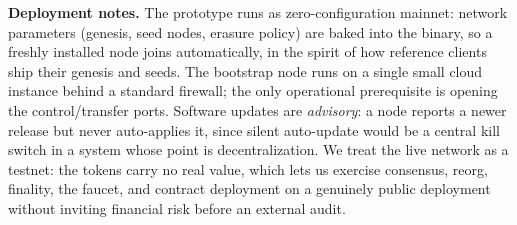 \textbf{Deployment notes.} The prototype runs as zero-configuration mainnet: network parameters
(genesis, seed nodes, erasure policy) are baked into the binary, so a freshly installed node joins
automatically, in the spirit of how reference clients ship their genesis and seeds. The bootstrap
node runs on a single small cloud instance behind a standard firewall; the only operational
prerequisite is opening the control/transfer ports. Software updates are \emph{advisory}: a node
reports a newer release but never auto-applies it, since silent auto-update would be a central
kill switch in a system whose point is decentralization. We treat the live network as a testnet:
the tokens carry no real value, which lets us exercise consensus, reorg, finality, the faucet, and
contract deployment on a genuinely public deployment without inviting financial risk before an
external audit.
